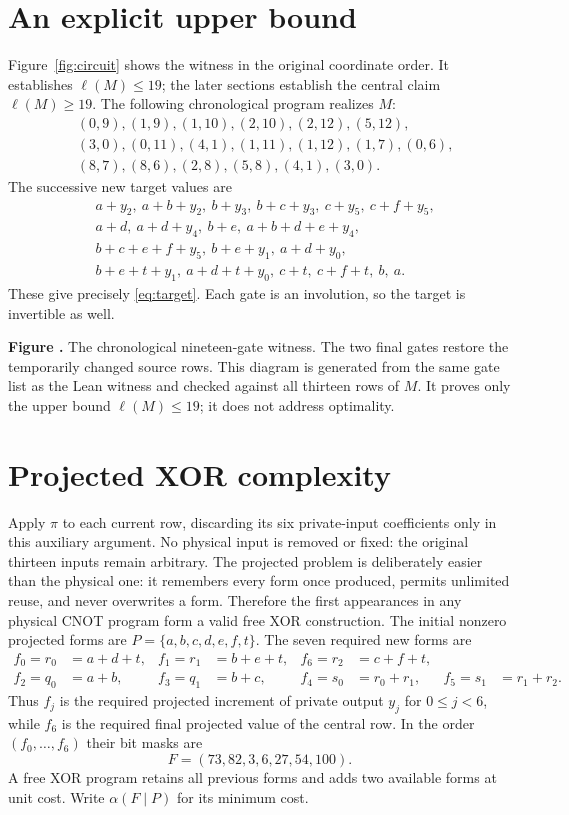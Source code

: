 \documentclass[11pt]{article}
\newcommand{\cost}{\ell}
\newcommand{\prooffigure}[3]{%
  \begin{center}
  \begin{minipage}{.98\linewidth}
  \centering
  \resizebox{\linewidth}{!}{}\par
  \refstepcounter{figure}\label{#2}%
  \small\textbf{Figure \thefigure.} #3
  \end{minipage}
  \end{center}}
\begin{document}
\section{An explicit upper bound}
Figure~\ref{fig:circuit} shows the witness in the original coordinate order.
It establishes $\cost(M)\le19$; the later sections establish
the central claim $\cost(M)\ge19$.
The following chronological program realizes $M$:
\begin{align*}
&(0,9),(1,9),(1,10),(2,10),(2,12),(5,12),\\
&(3,0),(0,11),(4,1),(1,11),(1,12),(1,7),(0,6),\\
&(8,7),(8,6),(2,8),(5,8),(4,1),(3,0).
\end{align*}
The successive new target values are
\begin{align*}
&a+y_2,\ a+b+y_2,\ b+y_3,\ b+c+y_3,\ c+y_5,\ c+f+y_5,\\
&a+d,\ a+d+y_4,\ b+e,\ a+b+d+e+y_4,\\
&b+c+e+f+y_5,\ b+e+y_1,\ a+d+y_0,\\
&b+e+t+y_1,\ a+d+t+y_0,\ c+t,\ c+f+t,\ b,\ a.
\end{align*}
These give precisely \eqref{eq:target}. Each gate is an involution, so the
target is invertible as well.
\prooffigure{cnot_circuit}{fig:circuit}{The chronological nineteen-gate
witness. The two final gates restore the temporarily changed source rows.
This diagram is generated from the same gate list as the Lean witness and
checked against all thirteen rows of $M$. It proves only the upper bound
$\cost(M)\le19$; it does not address optimality.}

\section{Projected XOR complexity}
Apply $\pi$ to each current row, discarding its six private-input
coefficients only in this auxiliary argument. No physical input is removed
or fixed: the original thirteen inputs remain arbitrary. The projected
problem is deliberately easier than the physical one: it remembers every
form once produced, permits unlimited reuse, and never overwrites a form.
Therefore the first appearances in any physical CNOT program form a valid
free XOR construction.
The initial nonzero projected forms are
$P=\{a,b,c,d,e,f,t\}$. The seven required new forms are
\begin{align*}
f_0=r_0&=a+d+t,&f_1=r_1&=b+e+t,&f_6=r_2&=c+f+t,\\
f_2=q_0&=a+b,&f_3=q_1&=b+c,&f_4=s_0&=r_0+r_1,
&f_5=s_1&=r_1+r_2.
\end{align*}
Thus $f_j$ is the required projected increment of private output $y_j$ for
$0\le j<6$, while $f_6$ is the required final projected value of the central
row. In the order $(f_0,\ldots,f_6)$ their bit masks are
\begin{equation}\label{eq:F}F=(73,82,3,6,27,54,100).\end{equation}
A free XOR program retains all previous forms and adds two available forms
at unit cost. Write $\alpha(F\mid P)$ for its minimum cost.
\end{document}

